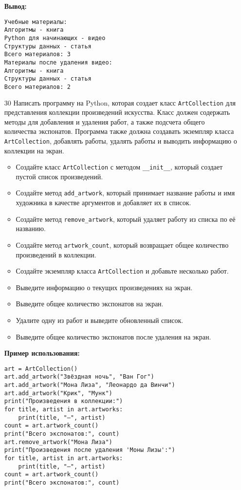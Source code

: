 \begin{enumerate}
\textbf{Вывод:}
\begin{verbatim}
Учебные материалы:
Алгоритмы - книга
Python для начинающих - видео
Структуры данных - статья
Всего материалов: 3
Материалы после удаления видео:
Алгоритмы - книга
Структуры данных - статья
Всего материалов: 2
\end{verbatim}

\item[30] Написать программу на Python, которая создает класс \texttt{ArtCollection} для представления коллекции произведений искусства. Класс должен содержать методы для добавления и удаления работ, а также подсчета общего количества экспонатов. Программа также должна создавать экземпляр класса \texttt{ArtCollection}, добавлять работы, удалять работы и выводить информацию о коллекции на экран.

\begin{itemize}
    \item Создайте класс \texttt{ArtCollection} с методом \texttt{\_\_init\_\_}, который создает пустой список произведений.
    \item Создайте метод \texttt{add\_artwork}, который принимает название работы и имя художника в качестве аргументов и добавляет их в список.
    \item Создайте метод \texttt{remove\_artwork}, который удаляет работу из списка по её названию.
    \item Создайте метод \texttt{artwork\_count}, который возвращает общее количество произведений в коллекции.
    \item Создайте экземпляр класса \texttt{ArtCollection} и добавьте несколько работ.
    \item Выведите информацию о текущих произведениях на экран.
    \item Выведите общее количество экспонатов на экран.
    \item Удалите одну из работ и выведите обновленный список.
    \item Выведите общее количество экспонатов после удаления на экран.
\end{itemize}

\textbf{Пример использования:}

\begin{verbatim}
art = ArtCollection()
art.add_artwork("Звёздная ночь", "Ван Гог")
art.add_artwork("Мона Лиза", "Леонардо да Винчи")
art.add_artwork("Крик", "Мунк")
print("Произведения в коллекции:")
for title, artist in art.artworks:
    print(title, "—", artist)
count = art.artwork_count()
print("Всего экспонатов:", count)
art.remove_artwork("Мона Лиза")
print("Произведения после удаления 'Моны Лизы':")
for title, artist in art.artworks:
    print(title, "—", artist)
count = art.artwork_count()
print("Всего экспонатов:", count)
\end{verbatim}


\end{enumerate}
